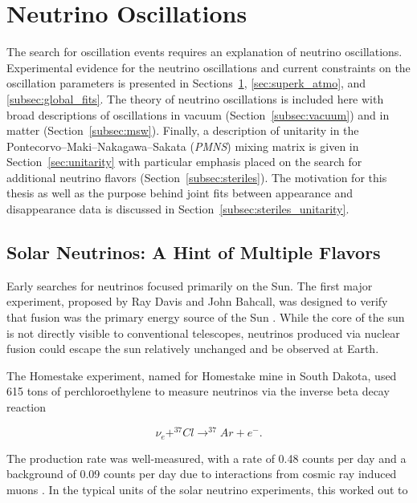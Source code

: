 \graphicspath{{chapters/oscillations/images/}}
\chapter{Neutrino Oscillations}
\label{chapter:oscillations}
The search for oscillation events requires an explanation of neutrino oscillations.
Experimental evidence for the neutrino oscillations and current constraints on the oscillation parameters is presented in Sections~\ref{chapter:oscillations}, \ref{sec:superk_atmo}, and \ref{subsec:global_fits}.
The theory of neutrino oscillations is included here with broad descriptions of oscillations in vacuum (Section~\ref{subsec:vacuum}) and in matter (Section~\ref{subsec:msw}). 
Finally, a description of unitarity in the Pontecorvo–Maki–Nakagawa–Sakata (\emph{PMNS}) mixing matrix is given in Section~\ref{sec:unitarity} with particular emphasis placed on the search for additional neutrino flavors (Section~\ref{subsec:steriles}).
The motivation for this thesis as well as the purpose behind joint fits between appearance and disappearance data is discussed in Section~\ref{subsec:steriles_unitarity}.

\section{Solar Neutrinos: A Hint of Multiple Flavors}
\label{bsec:solar_neutrinos}
Early searches for neutrinos focused primarily on the Sun.
The first major experiment, proposed by Ray Davis and John Bahcall, was designed to verify that fusion was the primary energy source of the Sun \cite{Homestake-Bahcall, Homestake-Davis}.
While the core of the sun is not directly visible to conventional telescopes, neutrinos produced via nuclear fusion could escape the sun relatively unchanged and be observed at Earth.

The Homestake experiment, named for Homestake mine in South Dakota, used 615 tons of perchloroethylene to measure neutrinos via the inverse beta decay reaction

\begin{equation}
\nu_e + ^{37}Cl \rightarrow ^{37}Ar + e^- .
\end{equation}

The production rate was well-measured, with a rate of 0.48 counts per day and a background of 0.09 counts per day due to interactions from cosmic ray induced muons \cite{Description-Homestake}.
In the typical units of the solar neutrino experiments, this worked out to 

